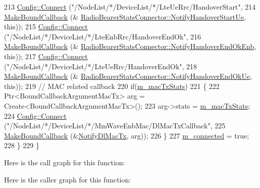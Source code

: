 \begin{DoxyCode}
213       \hyperlink{group__config_ga4014f151241cd0939b6cb64409605736}{Config::Connect} (\textcolor{stringliteral}{"/NodeList/*/DeviceList/*/LteUeRrc/HandoverStart"},
214                        \hyperlink{group__makeboundcallback_ga1725d6362e6065faa0709f7c93f8d770}{MakeBoundCallback} (&
      \hyperlink{classns3_1_1RadioBearerStatsConnector_a528848db35aea0f5cf5bd50973649ed0}{RadioBearerStatsConnector::NotifyHandoverStartUe}, \textcolor{keyword}{this}));
215       \hyperlink{group__config_ga4014f151241cd0939b6cb64409605736}{Config::Connect} (\textcolor{stringliteral}{"/NodeList/*/DeviceList/*/LteEnbRrc/HandoverEndOk"},
216                        \hyperlink{group__makeboundcallback_ga1725d6362e6065faa0709f7c93f8d770}{MakeBoundCallback} (&
      \hyperlink{classns3_1_1RadioBearerStatsConnector_a64e263f8e1571b8136daeb4e770e7b0b}{RadioBearerStatsConnector::NotifyHandoverEndOkEnb}, \textcolor{keyword}{this}));
217       \hyperlink{group__config_ga4014f151241cd0939b6cb64409605736}{Config::Connect} (\textcolor{stringliteral}{"/NodeList/*/DeviceList/*/LteUeRrc/HandoverEndOk"},
218                        \hyperlink{group__makeboundcallback_ga1725d6362e6065faa0709f7c93f8d770}{MakeBoundCallback} (&
      \hyperlink{classns3_1_1RadioBearerStatsConnector_a8923d2a7ed62c2fd37473f5a550a6323}{RadioBearerStatsConnector::NotifyHandoverEndOkUe}, \textcolor{keyword}{this}));
219       \textcolor{comment}{// MAC related callback}
220       \textcolor{keywordflow}{if}(\hyperlink{classns3_1_1RadioBearerStatsConnector_a76197254baf4c7b67ea68a421363e7fc}{m\_macTxStats})
221       \{
222         Ptr<BoundCallbackArgumentMacTx> arg = Create<BoundCallbackArgumentMacTx>();
223         arg->stats = \hyperlink{classns3_1_1RadioBearerStatsConnector_a76197254baf4c7b67ea68a421363e7fc}{m\_macTxStats};
224         \hyperlink{group__config_ga4014f151241cd0939b6cb64409605736}{Config::Connect} (\textcolor{stringliteral}{"/NodeList/*/DeviceList/*/MmWaveEnbMac/DlMacTxCallback"},
225            \hyperlink{group__makeboundcallback_ga1725d6362e6065faa0709f7c93f8d770}{MakeBoundCallback} (&\hyperlink{namespacens3_a1f1933361c16797838c1358b49c5a215}{NotifyDlMacTx}, arg));
226       \}
227       \hyperlink{classns3_1_1RadioBearerStatsConnector_ad8b0778133817a28e6cb1b81397b9f57}{m\_connected} = \textcolor{keyword}{true};
228     \}
229 \}
\end{DoxyCode}


Here is the call graph for this function\+:




Here is the caller graph for this function\+:


